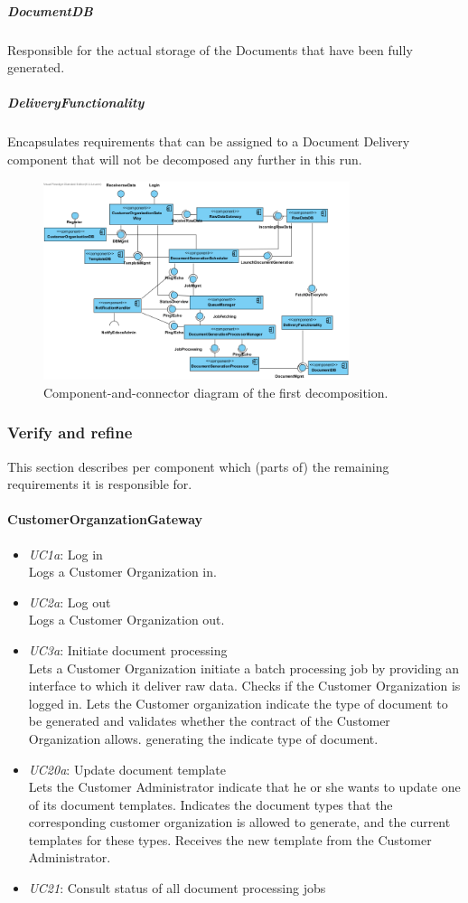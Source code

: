 \documentclass[a4paper,10pt]{article}
\begin{document}
\subparagraph{DocumentDB}
Responsible for the actual storage of the Documents that have been fully generated.

\subparagraph{DeliveryFunctionality}
Encapsulates requirements that can be assigned to a Document Delivery component that will not be decomposed any further in this run.

\begin{figure}[!htp]
	\centering
	\includegraphics[width=0.8\textwidth]{eDocsSystem.png}
	\caption{Component-and-connector diagram of the first decomposition.
	}\label{fig:compandcondecomp1}
\end{figure}

\subsubsection{Verify and refine}
This section describes per component which (parts of) the remaining
requirements it is responsible for.

\paragraph{CustomerOrganzationGateway}
\begin{itemize}
    \item \emph{UC1a}: Log in\\ Logs a Customer Organization in.
    \item \emph{UC2a}: Log out\\ Logs a Customer Organization out.
    \item \emph{UC3a}: Initiate document processing\\ Lets a Customer Organization initiate a  batch processing job by providing an interface to which it deliver raw data. Checks if the Customer Organization is logged in. Lets the Customer organization indicate the type of document to be generated and validates whether the contract of the Customer Organization allows. generating the indicate type of document.
    \item \emph{UC20a}: Update document template\\ Lets the Customer Administrator indicate that he or she wants to update one of its document templates. Indicates the document types that the corresponding customer organization is allowed to generate, and the current templates for these types. Receives the new template from the Customer Administrator.
    \item \emph{UC21}: Consult status of all document processing jobs
\end{itemize}
\end{document}
